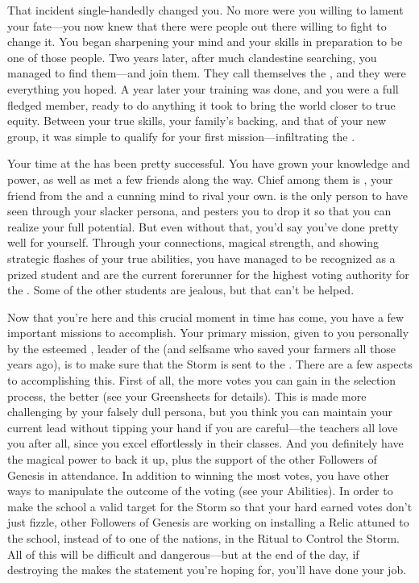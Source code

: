 \documentclass[char]{GL2020}
\begin{document}
That incident single-handedly changed you. No more were you willing to lament your fate---you now knew that there were people out there willing to fight to change it. You began sharpening your mind and your skills in preparation to be one of those people. Two years later, after much clandestine searching, you managed to find them---and join them. They call themselves the \pGoaties{}, and they were everything you hoped. A year later your training was done, and you were a full fledged member, ready to do anything it took to bring the world closer to true equity. Between your true skills, your family's backing, and that of your new group, it was simple to qualify for your first mission---infiltrating the \pSchool{}.
 
Your time at the \pSc{} has been pretty successful. You have grown your knowledge and power, as well as met a few friends along the way. Chief among them is \cAmbition{\full}, your friend from the \pTech{} and a cunning mind to rival your own. \cAmbition{} is the only person to have seen through your slacker persona, and pesters you to drop it so that you can realize your full potential. But even without that, you'd say you've done pretty well for yourself. Through your connections, magical strength, and showing strategic flashes of your true abilities, you have managed to be recognized as a prized student and are the current forerunner for the highest voting authority for the \pFarm{}. Some of the other students are jealous, but that can't be helped.
 
Now that you're here and this crucial moment in time has come, you have a few important missions to accomplish. Your primary mission, given to you personally by the esteemed \cChupLeader{\full}, leader of the \pGoaties{} (and selfsame \cChupLeader{\person} who saved your farmers all those years ago), is to make sure that the Storm is sent to the \pSc{}. There are a few aspects to accomplishing this. First of all, the more votes you can gain in the selection process, the better (see your Greensheets for details). This is made more challenging by your falsely dull persona, but you think you can maintain your current lead without tipping your hand if you are careful---the teachers all love you after all, since you excel effortlessly in their classes. And you definitely have the magical power to back it up, plus the support of the other Followers of Genesis in attendance. In addition to winning the most votes, you have other ways to manipulate the outcome of the voting (see your Abilities). In order to make the school a valid target for the Storm so that your hard earned votes don't just fizzle, other Followers of Genesis are working on installing a Relic attuned to the school, instead of to one of the nations, in the Ritual to Control the Storm. All of this will be difficult and dangerous---but at the end of the day, if destroying the \pSc{} makes the statement you're hoping for, you'll have done your job.
 
\end{document}

